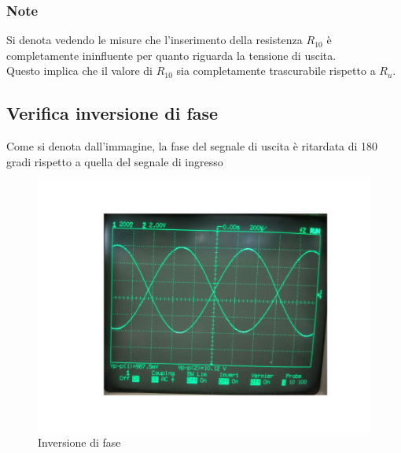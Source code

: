 \documentclass{article}
\begin{document}
\subsubsection{Note}
Si denota vedendo le misure che l'inserimento della resistenza $R_{10}$ è completamente ininfluente per quanto riguarda la tensione di uscita.\\Questo implica che il valore di $R_{10}$ sia completamente 
trascurabile rispetto a $R_{u}$.
\subsection{Verifica inversione di fase}
Come si denota dall'immagine, la fase del segnale di uscita è ritardata di 180 gradi rispetto a quella del segnale di ingresso
\begin{figure}[!h]
  \includegraphics[width=\textwidth]{fase.jpg}
  \caption{Inversione di fase}
  \label{fig:invfase1}
\end{figure}
\end{document}
